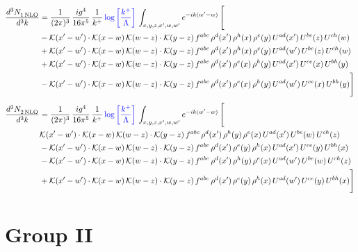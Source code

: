\documentclass[9pt]{article}
\numberwithin{equation}{section}
\begin{document}
\begin{align}
    \frac{d^{3}N_{1\,\rm NLO}^{\rm}}{d^{3}k}  & = \frac{1}{(2\pi)^{3}}\, \frac{ig^{4}}{16\pi^{5}}\, \frac{1}{k^{+}}\, {\color{blue}\log{\left[\frac{k^{+}}{\Lambda}\right]}}\,\int_{x,y,z,x^{\prime},w,w^{\prime}}e^{-ik(w^{\prime}-w)}\, \Bigg[\notag \\ & -\mathcal{K}(x'-w')\cdot \mathcal{K}(x-w)\, \mathcal{K}(w-z)\cdot \mathcal{K}(y-z)\,f^{abc}\,\rho^{d}(x')\,\rho^{h}(x)\,\rho^{e}(y)\,U^{ad}(x')\,U^{be}(z)\,U^{ch}(w)\notag \\ & + \mathcal{K}(x'-w')\cdot \mathcal{K}(x-w)\, \mathcal{K}(w-z)\cdot \mathcal{K}(y-z)\,f^{abc}\,\rho^{d}(x')\,\rho^{h}(x)\,\rho^{e}(y)\,U^{ad}(w')\,U^{be}(z)\,U^{ch}(w)\notag \\ & +\mathcal{K}(x'-w')\cdot \mathcal{K}(x-w)\, \mathcal{K}(w-z)\cdot \mathcal{K}(y-z)\,f^{abc}\,\rho^{d}(x')\,\rho^{e}(x)\,\rho^{h}(y)\,U^{ad}(x')\,U^{ce}(x)\,U^{bh}(y)\notag \\ & -\mathcal{K}(x'-w')\cdot \mathcal{K}(x-w)\, \mathcal{K}(w-z)\cdot \mathcal{K}(y-z)\,f^{abc}\,\rho^{d}(x')\,\rho^{e}(x)\,\rho^{h}(y)\,U^{ad}(w')\,U^{ce}(x)\,U^{bh}(y) \Bigg]
\end{align}
\begin{align}
    \frac{d^{3}N_{2\,\rm NLO}^{\rm}}{d^{3}k}  & = \frac{1}{(2\pi)^{3}}\, \frac{ig^{4}}{16\pi^{5}}\, \frac{1}{k^{+}}\, {\color{blue}\log{\left[\frac{k^{+}}{\Lambda}\right]}}\,\int_{x,y,z,x^{\prime},w,w^{\prime}}e^{-ik(w^{\prime}-w)}\, \Bigg[\notag \\ & \mathcal{K}(x'-w')\cdot \mathcal{K}(x-w)\, \mathcal{K}(w-z)\cdot \mathcal{K}(y-z)\,f^{abc}\,\rho^{d}(x')\,\rho^{h}(y)\,\rho^{e}(x)\,U^{ad}(x')\,U^{be}(w)\,U^{ch}(z)\notag \\ & - \mathcal{K}(x'-w')\cdot \mathcal{K}(x-w)\, \mathcal{K}(w-z)\cdot \mathcal{K}(y-z)\,f^{abc}\,\rho^{d}(x')\,\rho^{e}(y)\,\rho^{h}(x)\,U^{ad}(x')\,U^{ce}(y)\,U^{bh}(x)\notag \\ & -\mathcal{K}(x'-w')\cdot \mathcal{K}(x-w)\, \mathcal{K}(w-z)\cdot \mathcal{K}(y-z)\,f^{abc}\,\rho^{d}(x')\,\rho^{h}(y)\,\rho^{e}(x)\,U^{ad}(w')\,U^{be}(w)\,U^{ch}(z)\,\notag \\ & + \mathcal{K}(x'-w')\cdot \mathcal{K}(x-w)\, \mathcal{K}(w-z)\cdot \mathcal{K}(y-z)\,f^{abc}\,\rho^{d}(x')\,\rho^{e}(y)\,\rho^{h}(x)\,U^{ad}(w')\,U^{ce}(y)\,U^{bh}(x) \Bigg]
\end{align}
\section{Group II}
\end{document}
